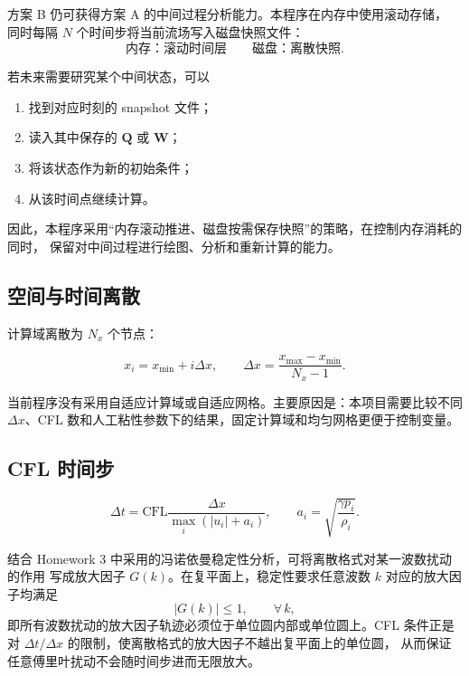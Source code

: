 方案 B 仍可获得方案 A 的中间过程分析能力。本程序在内存中使用滚动存储，
同时每隔 $N$ 个时间步将当前流场写入磁盘快照文件：
\begin{equation}
\text{内存：滚动时间层}
\qquad
\text{磁盘：离散快照}.
\end{equation}

若未来需要研究某个中间状态，可以
\begin{enumerate}[leftmargin=2em]
    \item 找到对应时刻的 snapshot 文件；
    \item 读入其中保存的 $\bm{Q}$ 或 $\bm{W}$；
    \item 将该状态作为新的初始条件；
    \item 从该时间点继续计算。
\end{enumerate}

因此，本程序采用“内存滚动推进、磁盘按需保存快照”的策略，在控制内存消耗的同时，
保留对中间过程进行绘图、分析和重新计算的能力。


\subsection{空间与时间离散}

计算域离散为 $N_x$ 个节点：

\begin{equation}
x_i=x_{\min}+i\Delta x,
\qquad
\Delta x=\frac{x_{\max}-x_{\min}}{N_x-1}.
\end{equation}

当前程序没有采用自适应计算域或自适应网格。主要原因是：本项目需要比较不同
\(\Delta x\)、CFL 数和人工粘性参数下的结果，固定计算域和均匀网格更便于控制变量。

\subsection{CFL 时间步}

\begin{equation}
\Delta t
=
\mathrm{CFL}
\frac{\Delta x}
{\max_i(|u_i|+a_i)},
\qquad
a_i=\sqrt{\frac{\gamma p_i}{\rho_i}}.
\end{equation}

结合 Homework 3 中采用的冯诺依曼稳定性分析，可将离散格式对某一波数扰动的作用
写成放大因子 $G(k)$。在复平面上，稳定性要求任意波数 $k$ 对应的放大因子均满足
\begin{equation}
\left|G(k)\right|\leq 1,
\qquad \forall\,k,
\end{equation}
即所有波数扰动的放大因子轨迹必须位于单位圆内部或单位圆上。CFL 条件正是对
$\Delta t/\Delta x$ 的限制，使离散格式的放大因子不越出复平面上的单位圆，
从而保证任意傅里叶扰动不会随时间步进而无限放大。

